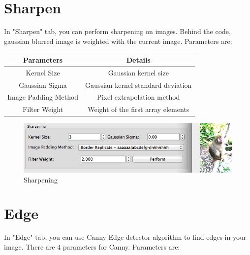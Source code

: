 \documentclass{article}
\begin{document}
\section{Sharpen}
In "Sharpen" tab, you can perform sharpening on images. Behind the code, gaussian blurred image is weighted with the current image. Parameters are:

\begin{table}[H]
\begin{center}
\begin{tabular}{|c|c|l|l|l|}
\hline
\textbf{Parameters}  & \multicolumn{4}{|c|}{\textbf{Details}}                   \\ \hline
Kernel Size          & \multicolumn{4}{|c|}{Gaussian kernel size}               \\ \hline
Gaussian Sigma       & \multicolumn{4}{|c|}{Gaussian kernel standard deviation} \\ \hline
Image Padding Method & \multicolumn{4}{|c|}{Pixel extrapolation method} \\ \hline
Filter Weight        & \multicolumn{4}{|c|}{Weight of the first array elements} \\ \hline
\end{tabular}
\end{center}
\end{table}


\begin{figure}[H]
\begin{center}
\includegraphics[scale=0.5]{toolboxSharpen.png}
\caption{Sharpening}
\end{center}
\end{figure}	

\section{Edge}
In "Edge" tab, you can use Canny Edge detector algorithm to find edges in your image. There are 4 parameters for Canny. Parameters are:
\end{document}
